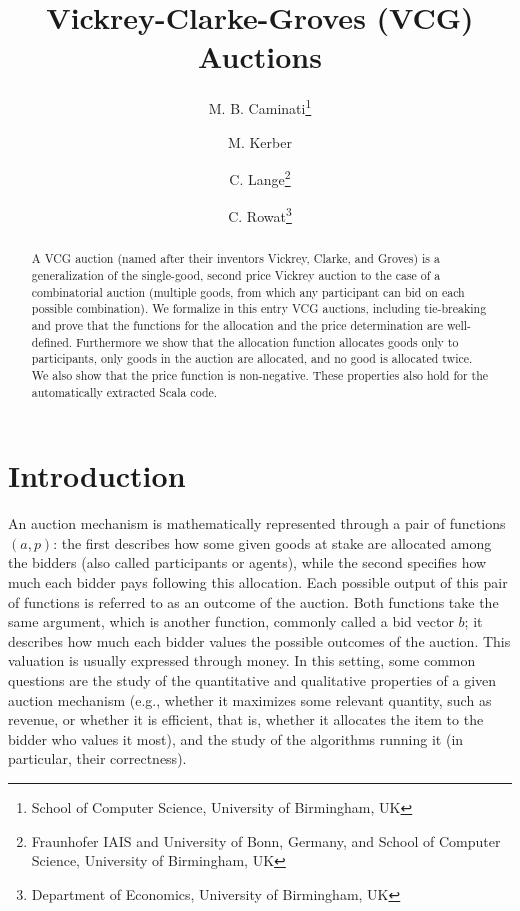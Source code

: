 \documentclass[11pt,a4paper]{article}
\begin{document}
\title{Vickrey-Clarke-Groves (VCG) Auctions}
\author{M. B. Caminati\footnote{School of Computer Science, University of Birmingham, UK}\addtocounter{footnote}{-1}
  \and M. Kerber\footnotemark
  \and C. Lange\footnote{Fraunhofer IAIS and University of Bonn, Germany, and School of Computer Science, University of Birmingham, UK}
  \and C. Rowat\footnote{Department of Economics, University of Birmingham, UK}}

\maketitle

\begin{abstract}
A VCG auction (named after their inventors Vickrey, Clarke, and
Groves) is a generalization of the single-good, second price Vickrey
auction to the case of a combinatorial auction (multiple goods, from
which any participant can bid on each possible combination). We
formalize in this entry VCG auctions, including tie-breaking and prove
that the functions for the allocation and the price determination are
well-defined. Furthermore we show that the allocation function
allocates goods only to participants, only goods in the auction are
allocated, and no good is allocated twice. We also show that the price
function is non-negative. These properties also hold for the
automatically extracted Scala code.
\end{abstract}


\tableofcontents

\section{Introduction}
An auction mechanism is mathematically represented through a pair of
functions $(a, p)$: the first describes how some given goods at stake
are allocated among the bidders (also called participants or agents),
while the second specifies how much each bidder pays following this
allocation.  Each possible output of this pair of functions is
referred to as an outcome of the auction. Both functions take the same
argument, which is another function, commonly called a bid vector $b$;
it describes how much each bidder values the possible outcomes of the
auction. This valuation is usually expressed through money.  In this
setting, some common questions are the study of the quantitative and
qualitative properties of a given auction mechanism (e.g., whether it
maximizes some relevant quantity, such as revenue, or whether it is
efficient, that is, whether it allocates the item to the bidder who
values it most), and the study of the algorithms running it (in
particular, their correctness).
\end{document}
